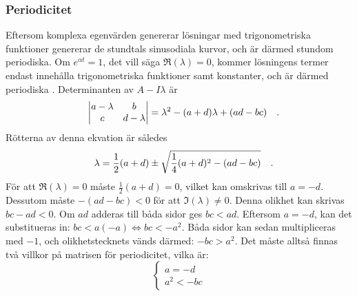 \subsubsection{Periodicitet}
Eftersom komplexa egenvärden genererar lösningar med trigonometriska funktioner genererar de stundtals sinusodiala kurvor, och är därmed stundom periodiska. Om \(e^{\alpha t}=1\), det vill säga \(\Re(\lambda)=0\), kommer lösningens termer endast innehålla trigonometriska funktioner samt konstanter, och är därmed periodiska \parencite[398]{zill_differential_2005}. Determinanten av \(A-I\lambda\) är
\begin{equation}
    \begin{vmatrix}
        a-\lambda & b\\
        c & d-\lambda
    \end{vmatrix}
    = \lambda^2-(a+d)\lambda+(ad-bc)
\quad\mathrm{.}\!\!\!\!\!\!\end{equation} Rötterna av denna ekvation är således
\begin{equation}
    \lambda=\frac{1}{2}(a+d)\pm \sqrt{\frac{1}{4}(a+d)^2-(ad-bc)}
\quad\mathrm{.}\!\!\!\!\!\!\end{equation} För att \(\Re(\lambda)=0\) måste \(\frac{1}{2}(a+d)=0\), vilket kan omskrivas till \(a=-d\). Dessutom måste \(-(ad-bc)<0\) för att \(\Im(\lambda)\neq0\). Denna olikhet kan skrivas \(bc-ad<0\). Om \(ad\) adderas till båda sidor ges \(bc<ad\). Eftersom \(a=-d\), kan det substitueras in: \(bc<a(-a)\Leftrightarrow bc<-a^2\). Båda sidor kan sedan multipliceras med \(-1\), och olikhetstecknets vänds därmed: \(-bc>a^2\). Det måste alltså finnas två villkor på matrisen för periodicitet, vilka är:
\begin{equation}\label{eq:conditions_periodicty}
    \begin{cases}
        a=-d\\
        a^2<-bc
    \end{cases}
\end{equation}

